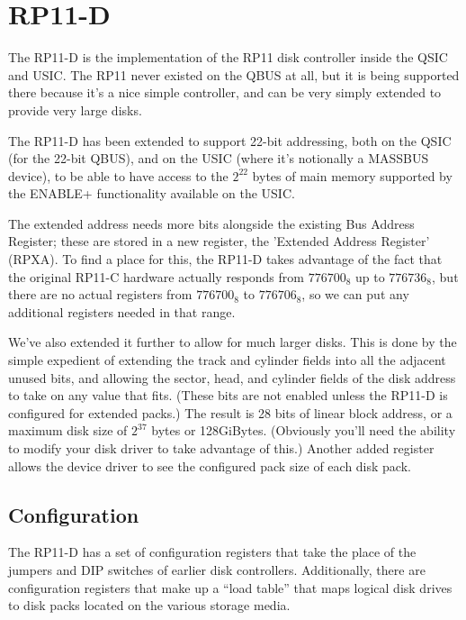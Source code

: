 %

\chapter{RP11-D}

The RP11-D is the implementation of the RP11 disk controller inside the QSIC
and USIC. The RP11 never existed on the QBUS at all, but it is being
supported there because it's a nice simple controller, and can be very simply
extended to provide very large disks.

The RP11-D has been extended to support 22-bit addressing, both on the QSIC
(for the 22-bit QBUS), and on the USIC (where it's notionally a MASSBUS
device), to be able to have access to the $2^{22}$ bytes of main memory
supported by the ENABLE+ functionality available on the USIC.

The extended address needs more bits alongside the existing Bus Address
Register; these are stored in a new register, the 'Extended Address Register'
(RPXA). To find a place for this, the RP11-D takes advantage of the fact that
the original RP11-C hardware actually responds from $776700_8$ up to
$776736_8$, but there are no actual registers from $776700_8$ to
$776706_8$, so we can put any additional registers needed in that range.

We've also extended it further to allow for much larger disks. This is done
by the simple expedient of extending the track and cylinder fields into all
the adjacent unused bits, and allowing the sector, head, and cylinder fields
of the disk address to take on any value that fits. (These bits are not
enabled unless the RP11-D is configured for extended packs.) The result is 28
bits of linear block address, or a maximum disk size of $2^{37}$ bytes or
128GiBytes. (Obviously you'll need the ability to modify your disk driver to
take advantage of this.) Another added register allows the device driver to
see the configured pack size of each disk pack.

\section{Configuration}

The RP11-D has a set of configuration registers that take the place of the jumpers
and DIP switches of earlier disk controllers.  Additionally, there are configuration
registers that make up a ``load table'' that maps logical disk drives to disk packs
located on the various storage media.

